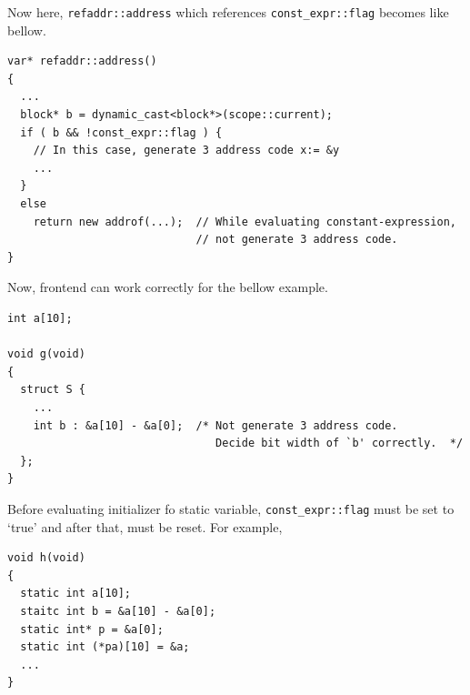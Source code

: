 Now here, {\tt{refaddr::address}} which references {\tt{const\_expr::flag}}
becomes like bellow.
\begin{verbatim}
var* refaddr::address()
{
  ...
  block* b = dynamic_cast<block*>(scope::current);
  if ( b && !const_expr::flag ) {
    // In this case, generate 3 address code x:= &y
    ...
  }
  else
    return new addrof(...);  // While evaluating constant-expression,
                             // not generate 3 address code.
}
\end{verbatim}
Now, frontend can work correctly for the bellow example.
\begin{verbatim}
int a[10];

void g(void)
{
  struct S {
    ...
    int b : &a[10] - &a[0];  /* Not generate 3 address code.
                                Decide bit width of `b' correctly.  */
  };
}
\end{verbatim}
Before evaluating initializer fo static variable,
{\tt{const\_expr::flag}} must be set to `true' and after that,
must be reset. For example,
\begin{verbatim}
void h(void)
{
  static int a[10];
  staitc int b = &a[10] - &a[0];
  static int* p = &a[0];
  static int (*pa)[10] = &a;
  ...
}
\end{verbatim}
